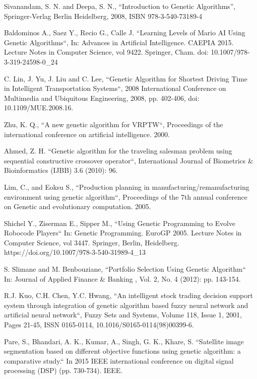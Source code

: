 \documentclass[conference]{IEEEtran}
\begin{document}
\begin{thebibliography}{00}

Sivanandam, S. N. and Deepa, S. N., ``Introduction to Genetic Algorithms'',
	Springer-Verlag Berlin Heidelberg, 2008, ISBN 978-3-540-73189-4

Baldominos A., Saez Y., Recio G., Calle J. ``Learning Levels of Mario AI Using Genetic Algorithms``,
	In: Advances in Artificial Intelligence. CAEPIA 2015. Lecture Notes in Computer Science, vol 9422. Springer, Cham. doi: 10.1007/978-3-319-24598-0\_24

C. Lin, J. Yu, J. Liu and C. Lee, ``Genetic Algorithm for Shortest Driving Time in Intelligent Transportation Systems``, 2008 International Conference on Multimedia and Ubiquitous Engineering, 2008, pp. 402-406, doi: 10.1109/MUE.2008.16.

Zhu, K. Q., ``A new genetic algorithm for VRPTW``, Proceedings of the international conference on artificial intelligence. 2000.

Ahmed, Z. H. ``Genetic algorithm for the traveling salesman problem using sequential constructive crossover operator``, International Journal of Biometrics \& Bioinformatics (IJBB) 3.6 (2010): 96.

Lim, C., and Eoksu S., ``Production planning in manufacturing/remanufacturing environment using genetic algorithm``, Proceedings of the 7th annual conference on Genetic and evolutionary computation. 2005.

Shichel Y., Ziserman E., Sipper M., ``Using Genetic Programming to Evolve Robocode Players`` In: Genetic Programming. EuroGP 2005. Lecture Notes in Computer Science, vol 3447. Springer, Berlin, Heidelberg. https://doi.org/10.1007/978-3-540-31989-4\_13

S. Slimane and M. Benbouziane, ``Portfolio Selection Using Genetic Algorithm`` In: Journal of Applied Finance \& Banking , Vol. 2, No. 4 (2012): pp. 143-154.

R.J. Kuo, C.H. Chen, Y.C. Hwang, ``An intelligent stock trading decision support system through integration of genetic algorithm based fuzzy neural network and artificial neural network``,
Fuzzy Sets and Systems,
Volume 118, Issue 1,
2001,
Pages 21-45,
ISSN 0165-0114,
10.1016/S0165-0114(98)00399-6.

Pare, S., Bhandari, A. K., Kumar, A., Singh, G. K., Khare, S. ``Satellite image segmentation based on different objective functions using genetic algorithm: a comparative study.`` In 2015 IEEE international conference on digital signal processing (DSP) (pp. 730-734). IEEE.


\end{thebibliography}
\end{document}
